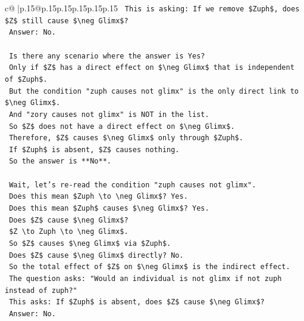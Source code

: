 \documentclass{article}
\begin{document}
{\begin{supertabular}{c@{$\;$}|p{.15\linewidth}@{}p{.15\linewidth}p{.15\linewidth}p{.15\linewidth}p{.15\linewidth}p{.15\linewidth}}
{{{\texttt{    This is asking: If we remove \$Zuph\$, does \$Z\$ still cause \$\textbackslash{}neg Glimx\$?} \\
\texttt{    Answer: No.} \\
\\ 
\texttt{    Is there any scenario where the answer is Yes?} \\
\texttt{    Only if \$Z\$ has a direct effect on \$\textbackslash{}neg Glimx\$ that is independent of \$Zuph\$.} \\
\texttt{    But the condition "zuph causes not glimx" is the only direct link to \$\textbackslash{}neg Glimx\$.} \\
\texttt{    And "zory causes not glimx" is NOT in the list.} \\
\texttt{    So \$Z\$ does not have a direct effect on \$\textbackslash{}neg Glimx\$.} \\
\texttt{    Therefore, \$Z\$ causes \$\textbackslash{}neg Glimx\$ only through \$Zuph\$.} \\
\texttt{    If \$Zuph\$ is absent, \$Z\$ causes nothing.} \\
\texttt{    So the answer is **No**.} \\
\\ 
\texttt{    Wait, let's re{-}read the condition "zuph causes not glimx".} \\
\texttt{    Does this mean \$Zuph \textbackslash{}to \textbackslash{}neg Glimx\$? Yes.} \\
\texttt{    Does this mean \$Zuph\$ causes \$\textbackslash{}neg Glimx\$? Yes.} \\
\texttt{    Does \$Z\$ cause \$\textbackslash{}neg Glimx\$?} \\
\texttt{    \$Z \textbackslash{}to Zuph \textbackslash{}to \textbackslash{}neg Glimx\$.} \\
\texttt{    So \$Z\$ causes \$\textbackslash{}neg Glimx\$ via \$Zuph\$.} \\
\texttt{    Does \$Z\$ cause \$\textbackslash{}neg Glimx\$ directly? No.} \\
\texttt{    So the total effect of \$Z\$ on \$\textbackslash{}neg Glimx\$ is the indirect effect.} \\
\texttt{    The question asks: "Would an individual is not glimx if not zuph instead of zuph?"} \\
\texttt{    This asks: If \$Zuph\$ is absent, does \$Z\$ cause \$\textbackslash{}neg Glimx\$?} \\
\texttt{    Answer: No.} \\
\\ 
}}}
\end{supertabular}}
\end{document}
